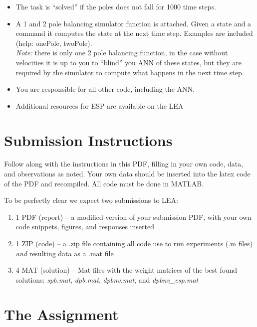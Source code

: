 \documentclass{article}
\begin{document}
		\begin{itemize}
		\item The task is ``solved'' if the poles does not fall for 1000 time steps.
		\item A 1 and 2 pole balancing simulator function is attached. Given a state and a command it computes the state at the next time step. Examples are included (help: onePole, twoPole). \\\textit{Note:} there is only one 2 pole balancing function, in the case without velocities it is up to you to ``blind'' you ANN of these states, but they are required by the simulator to compute what happens in the next time step.		
		\item You are responsible for all other code, including the ANN.
		\item Additional resources for ESP are available on the LEA
	\end{itemize}

\section{Submission Instructions}
Follow along with the instructions in this PDF, filling in your own code, data, and observations as noted. Your own data should be inserted into the latex code of the PDF and recompiled. All code must be done in MATLAB.

To be perfectly clear we expect two submissions to LEA:
\begin{enumerate}
	\item 1 PDF (report)   -- a modified version of your submission PDF, with your own code snippets, figures, and responses inserted
	\item 1 ZIP (code)     -- a .zip file containing all code use to run experiments (.m files) \textit{and} resulting data as a .mat file
	\item 4 MAT (solution) -- Mat files with the weight matrices of the best found solutions: \textit{spb.mat}, \textit{dpb.mat}, \textit{dpbnv.mat}, and \textit{dpbnv\_esp.mat}
\end{enumerate}





\newpage
\section{The Assignment}
\end{document}
